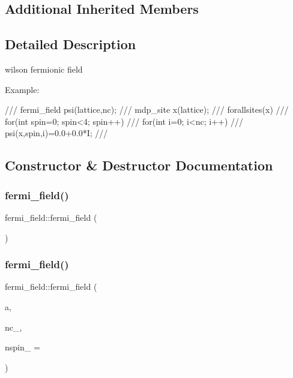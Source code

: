 \subsection*{Additional Inherited Members}


\subsection{Detailed Description}
wilson fermionic field 

Example\+: \begin{DoxyVerb}/// fermi_field psi(lattice,nc);
/// mdp_site x(lattice);
/// forallsites(x)
///    for(int spin=0; spin<4; spin++)
///      for(int i=0; i<nc; i++)
///        psi(x,spin,i)=0.0+0.0*I;
/// \end{DoxyVerb}
 

\subsection{Constructor \& Destructor Documentation}
\mbox{\label{classfermi__field_acaad044954df881d59d08b8b118b20e2}} 
\subsubsection{\texorpdfstring{fermi\+\_\+field()}{fermi\_field()}\hspace{0.1cm}{\footnotesize\ttfamily [1/3]}}
{\footnotesize\ttfamily fermi\+\_\+field\+::fermi\+\_\+field (\begin{DoxyParamCaption}{ }\end{DoxyParamCaption})\hspace{0.3cm}{\ttfamily [inline]}}

\mbox{\label{classfermi__field_a74efc2481ac9e64071680ebad9e93569}} 
\subsubsection{\texorpdfstring{fermi\+\_\+field()}{fermi\_field()}\hspace{0.1cm}{\footnotesize\ttfamily [2/3]}}
{\footnotesize\ttfamily fermi\+\_\+field\+::fermi\+\_\+field (\begin{DoxyParamCaption}\item[{\hyperlink{classmdp__lattice}{mdp\+\_\+lattice} \&}]{a,  }\item[{int}]{nc\+\_\+,  }\item[{int}]{nspin\+\_\+ = {} }\end{DoxyParamCaption})\hspace{0.3cm}{\ttfamily [inline]}}

